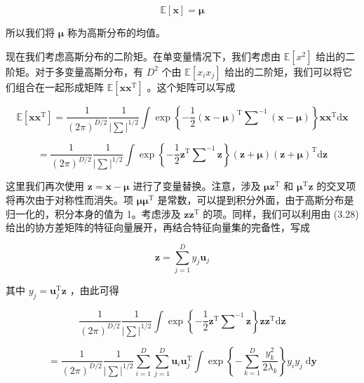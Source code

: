 \documentclass[10pt]{report}
\begin{document}
\[
\mathbb{E}\left\lbrack  \mathbf{x}\right\rbrack   = \mathbf{\mu } \tag{3.42}
\]

所以我们将 \(\mathbf{\mu }\) 称为高斯分布的均值。

现在我们考虑高斯分布的二阶矩。在单变量情况下，我们考虑由 \(\mathbb{E}\left\lbrack  {x}^{2}\right\rbrack\) 给出的二阶矩。对于多变量高斯分布，有 \({D}^{2}\) 个由 \(\mathbb{E}\left\lbrack  {{x}_{i}{x}_{j}}\right\rbrack\) 给出的二阶矩，我们可以将它们组合在一起形成矩阵 \(\mathbb{E}\left\lbrack  {\mathbf{{xx}}}^{\mathrm{T}}\right\rbrack\) 。这个矩阵可以写成

\[
\mathbb{E}\left\lbrack  {\mathbf{{xx}}}^{\mathrm{T}}\right\rbrack   = \frac{1}{{\left( 2\pi \right) }^{D/2}}\frac{1}{{\left| \mathbf{\sum }\right| }^{1/2}}\int \exp \left\{  {-\frac{1}{2}{\left( \mathbf{x} - \mathbf{\mu }\right) }^{\mathrm{T}}{\mathbf{\sum }}^{-1}\left( {\mathbf{x} - \mathbf{\mu }}\right) }\right\}  {\mathbf{{xx}}}^{\mathrm{T}}\mathrm{d}\mathbf{x}
\]

\[
= \frac{1}{{\left( 2\pi \right) }^{D/2}}\frac{1}{{\left| \mathbf{\sum }\right| }^{1/2}}\int \exp \left\{  {-\frac{1}{2}{\mathbf{z}}^{\mathrm{T}}{\mathbf{\sum }}^{-1}\mathbf{z}}\right\}  \left( {\mathbf{z} + \mathbf{\mu }}\right) {\left( \mathbf{z} + \mathbf{\mu }\right) }^{\mathrm{T}}\mathrm{d}\mathbf{z} \tag{3.43}
\]

这里我们再次使用 \(\mathbf{z} = \mathbf{x} - \mathbf{\mu }\) 进行了变量替换。注意，涉及 \(\mathbf{\mu }{\mathbf{z}}^{\mathrm{T}}\) 和 \({\mathbf{\mu }}^{\mathrm{T}}\mathbf{z}\) 的交叉项将再次由于对称性而消失。项 \(\mathbf{\mu }{\mathbf{\mu }}^{\mathrm{T}}\) 是常数，可以提到积分外面，由于高斯分布是归一化的，积分本身的值为 1。考虑涉及 \({\mathbf{{zz}}}^{\mathrm{T}}\) 的项。同样，我们可以利用由 (3.28) 给出的协方差矩阵的特征向量展开，再结合特征向量集的完备性，写成

\[
\mathbf{z} = \mathop{\sum }\limits_{{j = 1}}^{D}{y}_{j}{\mathbf{u}}_{j} \tag{3.44}
\]

其中 \({y}_{j} = {\mathbf{u}}_{j}^{\mathrm{T}}\mathbf{z}\) ，由此可得

\[
\frac{1}{{\left( 2\pi \right) }^{D/2}}\frac{1}{{\left| \mathbf{\sum }\right| }^{1/2}}\int \exp \left\{  {-\frac{1}{2}{\mathbf{z}}^{\mathrm{T}}{\mathbf{\sum }}^{-1}\mathbf{z}}\right\}  \mathbf{z}{\mathbf{z}}^{\mathrm{T}}\mathrm{d}\mathbf{z}
\]

\[
= \frac{1}{{\left( 2\pi \right) }^{D/2}}\frac{1}{{\left| \mathbf{\sum }\right| }^{1/2}}\mathop{\sum }\limits_{{i = 1}}^{D}\mathop{\sum }\limits_{{j = 1}}^{D}{\mathbf{u}}_{i}{\mathbf{u}}_{j}^{\mathrm{T}}\int \exp \left\{  {-\mathop{\sum }\limits_{{k = 1}}^{D}\frac{{y}_{k}^{2}}{2{\lambda }_{k}}}\right\}  {y}_{i}{y}_{j}\mathrm{\;d}\mathbf{y}
\]
\end{document}

